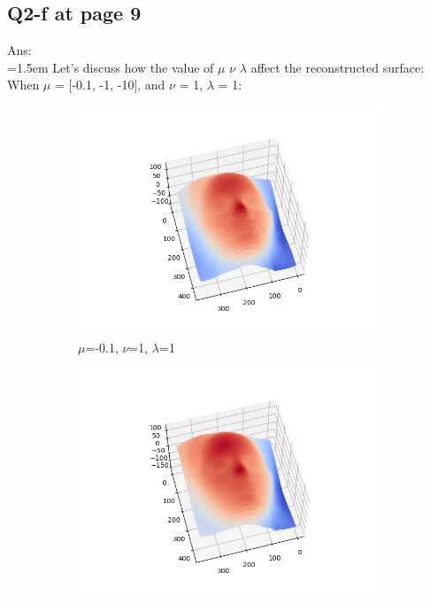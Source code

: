 \documentclass{article}
\begin{document}
	\subsection*{Q2-f at page 9}
	Ans:\\
	\hangindent=1.5em \hspace{1.5em}Let's discuss how the value of $\mu$ $\nu$ $\lambda$ affect the reconstructed surface: \\
	When $\mu$ = [-0.1, -1, -10], and $\nu$ = 1, $\lambda$ = 1: \\
\begin{figure}[H]
	\centering
	\begin{subfigure}{0.33\textwidth}
		\centering
		\includegraphics[width=\textwidth]{./src/2f_mu_change/faceCalibrated_mu_-0.1_v_1_lambda_1.png}
		\caption{$\mu$=-0.1, $\nu$=1, $\lambda$=1}
	\end{subfigure}
	\hfill
	\begin{subfigure}{0.32\textwidth}
		\centering
		\includegraphics[width=\textwidth]{./src/2f_mu_change/faceCalibrated_mu_-1_v_1_lambda_1.png}

\end{subfigure}
\end{figure}
\end{document}
